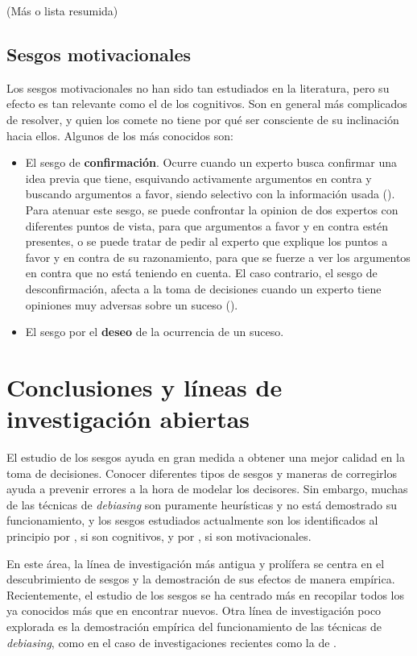 \documentclass[a4paper,11pt]{article}
\begin{document}
(Más o lista resumida)
\subsection{Sesgos motivacionales}
Los sesgos motivacionales no han sido tan estudiados en la literatura, pero su efecto es tan relevante como el de los cognitivos. Son en general más complicados de resolver, y quien los comete no tiene por qué ser consciente de su inclinación hacia ellos. Algunos de los más conocidos son:

\begin{itemize}

\item El sesgo de \textbf{confirmación}. Ocurre cuando un experto busca confirmar una idea previa que tiene, esquivando activamente argumentos en contra y buscando argumentos a favor, siendo selectivo con la información usada (\cite{correia2011}). Para atenuar este sesgo, se puede confrontar la opinion de dos expertos con diferentes puntos de vista, para que argumentos a favor y en contra estén presentes, o se puede tratar de pedir al experto que explique los puntos a favor y en contra de su razonamiento, para que se fuerze a ver los argumentos en contra que no está teniendo en cuenta. El caso contrario, el sesgo de desconfirmación, afecta a la toma de decisiones cuando un experto tiene opiniones muy adversas sobre un suceso (\cite{taber2009}).

\item El sesgo por el \textbf{deseo} de la ocurrencia de un suceso. 

\end{itemize}

\section{Conclusiones y líneas de investigación abiertas}

El estudio de los sesgos ayuda en gran medida a obtener una mejor calidad en la toma de decisiones. Conocer diferentes tipos de sesgos y maneras de corregirlos ayuda a prevenir errores a la hora de modelar los decisores. Sin embargo, muchas de las técnicas de \textit{debiasing} son puramente heurísticas y no está demostrado su funcionamiento, y los sesgos estudiados actualmente son los identificados al principio por \cite{tversky1974}, si son cognitivos, y por \cite{kunda1990}, si son motivacionales.

En este área, la línea de investigación más antigua y prolífera se centra en el descubrimiento de sesgos y la demostración de sus efectos de manera empírica. Recientemente, el estudio de los sesgos se ha centrado más en recopilar todos los ya conocidos más que en encontrar nuevos. Otra línea de investigación poco explorada es la demostración empírica del funcionamiento de las técnicas de \textit{debiasing}, como en el caso de investigaciones recientes como la de \cite{montibeller2015}.
\end{document}
